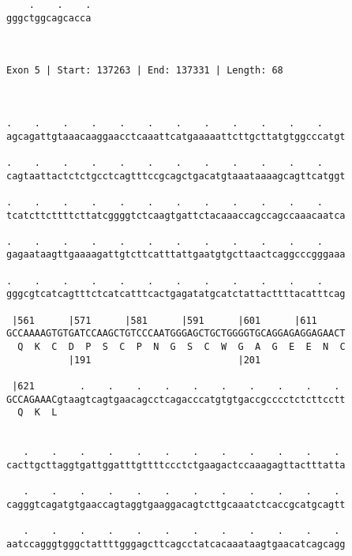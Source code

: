 \documentclass{article}
\begin{document}
\begin{Verbatim}
    .    .    .
gggctggcagcacca
               
               
 
Exon 5 | Start: 137263 | End: 137331 | Length: 68



.    .    .    .    .    .    .    .    .    .    .    .    
agcagattgtaaacaaggaacctcaaattcatgaaaaattcttgcttatgtggcccatgt
                                                            
.    .    .    .    .    .    .    .    .    .    .    .    
cagtaattactctctgcctcagtttccgcagctgacatgtaaataaaagcagttcatggt
                                                            
.    .    .    .    .    .    .    .    .    .    .    .    
tcatcttcttttcttatcggggtctcaagtgattctacaaaccagccagccaaacaatca
                                                            
.    .    .    .    .    .    .    .    .    .    .    .    
gagaataagttgaaaagattgtcttcatttattgaatgtgcttaactcaggcccgggaaa
                                                            
.    .    .    .    .    .    .    .    .    .    .    .    
gggcgtcatcagtttctcatcatttcactgagatatgcatctattacttttacatttcag
                                                            
 |561      |571      |581      |591      |601      |611     
GCCAAAAGTGTGATCCAAGCTGTCCCAATGGGAGCTGCTGGGGTGCAGGAGAGGAGAACT
  Q  K  C  D  P  S  C  P  N  G  S  C  W  G  A  G  E  E  N  C
           |191                          |201               
  
 |621        .    .    .    .    .    .    .    .    .    . 
GCCAGAAACgtaagtcagtgaacagcctcagacccatgtgtgaccgcccctctcttcctt
  Q  K  L                                                   
                                                            
  
   .    .    .    .    .    .    .    .    .    .    .    . 
cacttgcttaggtgattggatttgttttccctctgaagactccaaagagttactttatta
                                                            
   .    .    .    .    .    .    .    .    .    .    .    . 
cagggtcagatgtgaaccagtaggtgaaggacagtcttgcaaatctcaccgcatgcagtt
                                                            
   .    .    .    .    .    .    .    .    .    .    .    . 
aatccagggtgggctattttgggagcttcagcctatcacaaataagtgaacatcagcagg
                                                            

\end{Verbatim}
\end{document}
